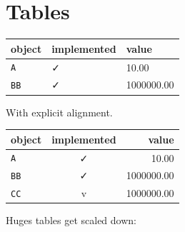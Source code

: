 \section{Tables}



\label{10628175048133282427}{}



\begin{table}[h]
\centering
\begin{tabulary}{\linewidth}{L L L}
\toprule
object & implemented & value \\
\toprule
\texttt{A} & ✓ & 10.00 \\
\texttt{BB} & ✓ & 1000000.00 \\
\bottomrule
\end{tabulary}

\end{table}



With explicit alignment.




\begin{table}[h]
\centering
\begin{tabulary}{\linewidth}{L C R}
\toprule
object & implemented & value \\
\toprule
\texttt{A} & ✓ & 10.00 \\
\texttt{BB} & ✓ & 1000000.00 \\
\texttt{CC} & v & 1000000.00 \\
\bottomrule
\end{tabulary}

\end{table}



Huges tables get scaled down:




